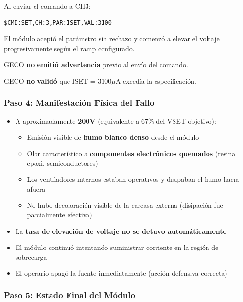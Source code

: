 \documentclass{article}
\begin{document}
Al enviar el comando a CH3:
\begin{verbatim}
$CMD:SET,CH:3,PAR:ISET,VAL:3100
\end{verbatim}

El módulo aceptó el parámetro sin rechazo y comenzó a elevar el voltaje progresivamente según el ramp configurado.

GECO \textbf{no emitió advertencia} previo al envío del comando.

GECO \textbf{no validó} que ISET = 3100\(\mu\)A excedía la especificación.

\subsubsection{Paso 4: Manifestación Física del Fallo}

\begin{itemize}
    \item A aproximadamente \textbf{200V} (equivalente a 67\% del VSET objetivo):
    \begin{itemize}
        \item Emisión visible de \textbf{humo blanco denso} desde el módulo
        \item Olor característico a \textbf{componentes electrónicos quemados} (resina epoxi, semiconductores)
        \item Los ventiladores internos estaban operativos y disipaban el humo hacia afuera
        \item No hubo decoloración visible de la carcasa externa (disipación fue parcialmente efectiva)
    \end{itemize}
    \item La \textbf{tasa de elevación de voltaje no se detuvo automáticamente}
    \item El módulo continuó intentando suministrar corriente en la región de sobrecarga
    \item El operario apagó la fuente inmediatamente (acción defensiva correcta)
\end{itemize}

\subsubsection{Paso 5: Estado Final del Módulo}
\end{document}
